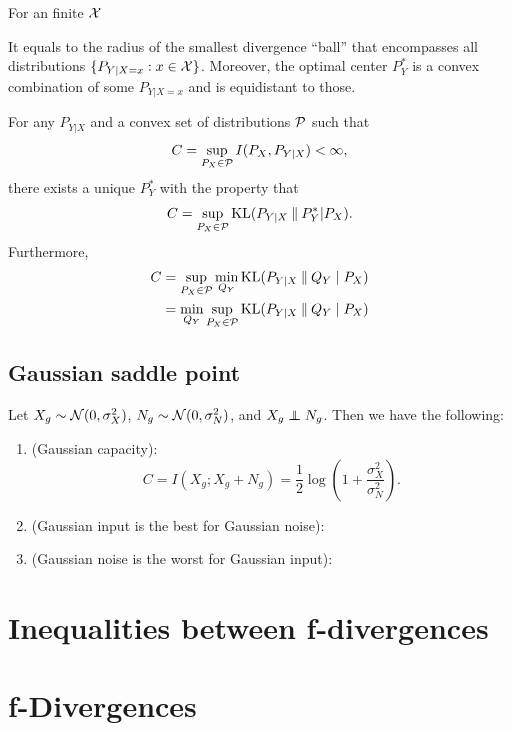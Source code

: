 \begin{corollary}
    For an finite $\mathcal{X}$
\end{corollary}

It equals to the radius of the smallest divergence ``ball'' that encompasses all distributions $\{P_{Y|X=x}:x\in\mathcal{X}\}$.
Moreover, the optimal center $P_Y^*$ is a convex combination of some $P_{Y|X=x}$ and is equidistant to those.


\begin{theorem}\label{thm:kemperman-capacity}
    For any $P_{Y|X}$ and a convex set of distributions $\mathcal{P}$ such that
    \[C=\sup_{P_X\in\mathcal{P}}I(P_X,P_{Y|X})<\infty,\]
    there exists a unique $P_Y^*$ with the property that 
    \[C=\sup_{P_X\in\mathcal{P}}\operatorname{KL}(P_{Y|X}\mathbin{\|} P_Y^*|P_X).\]
    Furthermore,
    \begin{align*}
        C&=\sup_{P_X\in\mathcal{P}}\min_{Q_Y}\operatorname{KL}(P_{Y|X}\mathbin{\|} Q_Y\mid P_X)\\
        &=\min_{Q_Y}\sup_{P_X\in\mathcal{P}}\operatorname{KL}(P_{Y|X}\mathbin{\|} Q_Y\mid P_X)
    \end{align*}
\end{theorem}

\subsection{Gaussian saddle point}

\begin{theorem}
    Let $X_g\sim\mathcal{N}(0,\sigma_X^2)$, $N_g\sim\mathcal{N}(0,\sigma_N^2)$, and $X_g\perp\!\!\!\!\perp N_g$.
    Then we have the following:
    \begin{enumerate}[label=(\roman*)]
        \item \textnormal{(Gaussian capacity)}: \[C=I(X_g;X_g+N_g)=\frac{1}{2}\log\left(1+\frac{\sigma_X^2}{\sigma_N^2}\right).\]
        \item \textnormal{(Gaussian input is the best for Gaussian noise)}:
        \item \textnormal{(Gaussian noise is the worst for Gaussian input)}:
    \end{enumerate}
\end{theorem}

\section{Inequalities between f-divergences}



\section{f-Divergences}

